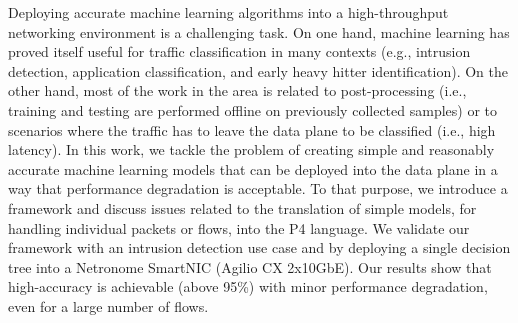 Deploying accurate machine learning algorithms into a high-throughput networking environment is a challenging task. On one hand, machine learning has proved itself useful for traffic classification in many contexts (e.g., intrusion detection, application classification, and early heavy hitter identification).
On the other hand, most of the work in the area is related to post-processing (i.e., training and testing are performed offline on previously collected samples) or to scenarios where the traffic has to leave the data plane to be classified (i.e., high latency).
In this work, we tackle the problem of creating simple and reasonably accurate machine learning models that can be deployed into the data plane in a way that performance degradation is acceptable.
To that purpose, we introduce a framework and discuss issues related to the translation of simple models, for handling individual packets or flows, into the P4 language.
We validate our framework with an intrusion detection use case and by deploying a single decision tree into a Netronome SmartNIC (Agilio CX 2x10GbE). 
Our results show that high-accuracy is achievable (above 95\%) with minor performance degradation, even for a large number of flows.
